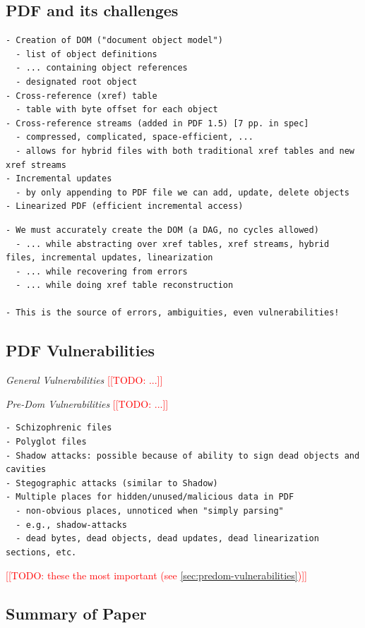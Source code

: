 \documentclass[conference,12pt]{IEEEtran}
\newcommand{\note}[1]{\noteYes{#1}}
\newcommand{\noteYes}[1]{\textcolor{red}{[[#1]]}}
\newcommand{\todo}[1]{\note{TODO: #1}}
\begin{document}
\subsection{PDF and its challenges}

\begin{lstlisting}[style=meta]
- Creation of DOM ("document object model")
  - list of object definitions
  - ... containing object references
  - designated root object
- Cross-reference (xref) table
  - table with byte offset for each object
- Cross-reference streams (added in PDF 1.5) [7 pp. in spec]
  - compressed, complicated, space-efficient, ...
  - allows for hybrid files with both traditional xref tables and new xref streams
- Incremental updates
  - by only appending to PDF file we can add, update, delete objects
- Linearized PDF (efficient incremental access)
\end{lstlisting}

\begin{lstlisting}[style=meta]
- We must accurately create the DOM (a DAG, no cycles allowed)
  - ... while abstracting over xref tables, xref streams, hybrid files, incremental updates, linearization
  - ... while recovering from errors
  - ... while doing xref table reconstruction

- This is the source of errors, ambiguities, even vulnerabilities!
\end{lstlisting}

\subsection{PDF Vulnerabilities}

\emph{General Vulnerabilities} \todo{...}

\emph{Pre-Dom Vulnerabilities} \todo{...}

\begin{lstlisting}[style=meta]
- Schizophrenic files
- Polyglot files
- Shadow attacks: possible because of ability to sign dead objects and cavities
- Stegographic attacks (similar to Shadow)
- Multiple places for hidden/unused/malicious data in PDF
  - non-obvious places, unnoticed when "simply parsing"
  - e.g., shadow-attacks
  - dead bytes, dead objects, dead updates, dead linearization sections, etc.
\end{lstlisting}

\todo{these the most important (see \cref{sec:predom-vulnerabilities})}


\subsection{Summary of Paper}
      
\end{document}

